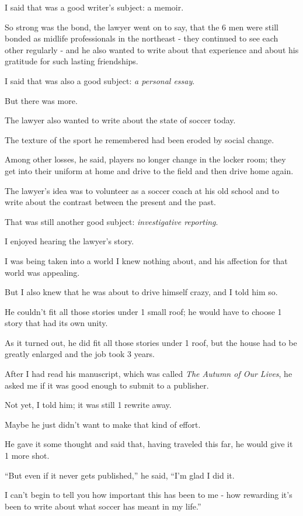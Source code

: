 \documentclass{book}
\numberwithin{equation}{section}
\begin{document}
I said that was a good writer's subject: a memoir.

%
So strong was the bond, the lawyer went on to say, that the 6 men were still bonded as midlife professionals in the northeast - they continued to see each other regularly - and he also wanted to write about that experience and about his gratitude for such lasting friendships.

I said that was also a good subject: \textit{a personal essay}.

%
But there was more.

The lawyer also wanted to write about the state of soccer today.

The texture of the sport he remembered had been eroded by social change.

Among other losses, he said, players no longer change in the locker room; they get into their uniform at home and drive to the field and then drive home again.

The lawyer's idea was to volunteer as a soccer coach at his old school and to write about the contrast between the present and the past.

That was still another good subject: \textit{investigative reporting}.

%
I enjoyed hearing the lawyer's story.

I was being taken into a world I knew nothing about, and his affection for that world was appealing.

But I also knew that he was about to drive himself crazy, and I told him so.

He couldn't fit all those stories under 1 small roof; he would have to choose 1 story that had its own unity.

As it turned out, he did fit all those stories under 1 roof, but the house had to be greatly enlarged and the job took 3 years.

%
After I had read his manuscript, which was called \textit{The Autumn of Our Lives}, he asked me if it was good enough to submit to a publisher.

Not yet, I told him; it was still 1 rewrite away.

Maybe he just didn't want to make that kind of effort.

He gave it some thought and said that, having traveled this far, he would give it 1 more shot.

%
``But even if it never gets published,'' he said, ``I'm glad I did it.

I can't begin to tell you how important this has been to me - how rewarding it's been to write about what soccer has meant in my life.''
\end{document}
